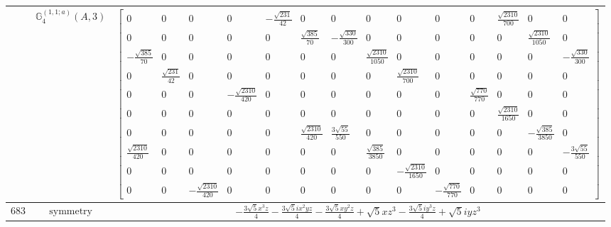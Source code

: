 \documentclass[fleqn,8pt,landscape]{jsarticle}
\begin{document}
\begin{longtable}{ccc}
$  $ & $ \mathbb{G}_{4}^{(1,1;a)}(A,3) $ & $ \begin{bmatrix} 0 & 0 & 0 & 0 & - \frac{\sqrt{231}}{42} & 0 & 0 & 0 & 0 & 0 & 0 & \frac{\sqrt{2310}}{700} & 0 & 0 \\ 0 & 0 & 0 & 0 & 0 & \frac{\sqrt{385}}{70} & - \frac{\sqrt{330}}{300} & 0 & 0 & 0 & 0 & 0 & \frac{\sqrt{2310}}{1050} & 0 \\ - \frac{\sqrt{385}}{70} & 0 & 0 & 0 & 0 & 0 & 0 & \frac{\sqrt{2310}}{1050} & 0 & 0 & 0 & 0 & 0 & - \frac{\sqrt{330}}{300} \\ 0 & \frac{\sqrt{231}}{42} & 0 & 0 & 0 & 0 & 0 & 0 & \frac{\sqrt{2310}}{700} & 0 & 0 & 0 & 0 & 0 \\ 0 & 0 & 0 & - \frac{\sqrt{2310}}{420} & 0 & 0 & 0 & 0 & 0 & 0 & \frac{\sqrt{770}}{770} & 0 & 0 & 0 \\ 0 & 0 & 0 & 0 & 0 & 0 & 0 & 0 & 0 & 0 & 0 & \frac{\sqrt{2310}}{1650} & 0 & 0 \\ 0 & 0 & 0 & 0 & 0 & \frac{\sqrt{2310}}{420} & \frac{3 \sqrt{55}}{550} & 0 & 0 & 0 & 0 & 0 & - \frac{\sqrt{385}}{3850} & 0 \\ \frac{\sqrt{2310}}{420} & 0 & 0 & 0 & 0 & 0 & 0 & \frac{\sqrt{385}}{3850} & 0 & 0 & 0 & 0 & 0 & - \frac{3 \sqrt{55}}{550} \\ 0 & 0 & 0 & 0 & 0 & 0 & 0 & 0 & - \frac{\sqrt{2310}}{1650} & 0 & 0 & 0 & 0 & 0 \\ 0 & 0 & - \frac{\sqrt{2310}}{420} & 0 & 0 & 0 & 0 & 0 & 0 & - \frac{\sqrt{770}}{770} & 0 & 0 & 0 & 0 \end{bmatrix} $ \\ \hline
$ 683 $ & $ \text{symmetry} $ & $ - \frac{3 \sqrt{5} x^{3} z}{4} - \frac{3 \sqrt{5} i x^{2} y z}{4} - \frac{3 \sqrt{5} x y^{2} z}{4} + \sqrt{5} x z^{3} - \frac{3 \sqrt{5} i y^{3} z}{4} + \sqrt{5} i y z^{3} $ \\

\end{longtable}
\end{document}
